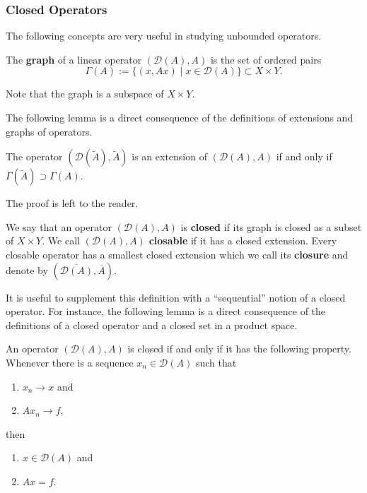 \subsubsection{Closed Operators}\label{subsec:closed-operators}

The following concepts are very useful in studying unbounded operators.

\begin{Definition}
\label{def:linear-operator-graph}
The \textbf{graph} of a linear operator $(\mathcal{D}(A),A)$ is the set of ordered pairs
\begin{equation}\label{eq:linear-operator-graph-definition}
\Gamma(A):=\{(x,Ax)\mid x\in\mathcal{D}(A)\}\subset X\times Y.
\end{equation}

\end{Definition}

Note that the graph is a subspace of $X\times Y$.

The following lemma is a direct consequence of the definitions of extensions and graphs of operators.

\begin{Lemma}
\label{lem:operator-extension-graph-inclusion}
The operator $(\mathcal{D}(\widetilde A),\widetilde A)$ is an extension of $(\mathcal{D}(A),A)$ if and only if $\Gamma(\widetilde A)\supset\Gamma(A)$.
\end{Lemma}

The proof is left to the reader.

\begin{Definition}
\label{def:closed-closable-operator-and-closure}
We say that an operator $(\mathcal{D}(A),A)$ is \textbf{closed} if its graph is closed as a subset of $X\times Y$. We call $(\mathcal{D}(A),A)$ \textbf{closable} if it has a closed extension. Every closable operator has a smallest closed extension which we call its \textbf{closure} and denote by $(\overline{\mathcal{D}(A)},\overline A)$.
\end{Definition}

It is useful to supplement this definition with a ``sequential'' notion of a closed operator. For instance, the following lemma is a direct consequence of the definitions of a closed operator and a closed set in a product space.

\begin{Lemma}
\label{lem:closed-operator-sequential-criterion}
An operator $(\mathcal{D}(A),A)$ is closed if and only if it has the following property. Whenever there is a sequence $x_n\in\mathcal{D}(A)$ such that\begin{enumerate}\item $x_n\to x$ and\item $Ax_n\to f$,\end{enumerate}then\begin{enumerate}\item $x\in\mathcal{D}(A)$ and\item $Ax=f$.\end{enumerate}
\end{Lemma}

